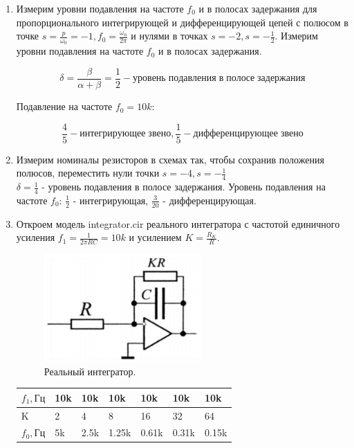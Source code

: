 \documentclass[12pt,a4paper]{article}
\begin{document}
\begin{enumerate}
    \item Измерим уровни подавления на частоте $f_0$ и в полосах задержания для пропорционального интегрирующей и дифференцирующей цепей 
    с полюсом в точке $s = \frac{p}{\omega_0} = -1, f_0 = \frac{\omega_0}{2\pi}$ и нулями в точках $s = -2, s = -\frac{1}{2}$.
    Измерим уровни подавления на частоте $f_0$ и в полосах задержания.

    \begin{equation}
        \delta = \frac{\beta}{\alpha + \beta} = \frac{1}{2} - уровень\; подавления\; в\; полосе\; задержания
    \end{equation}

    Подавление на частоте $f_0 = 10k$:

       $$ \frac{4}{5} - интегрирующее\; звено, \frac{1}{5} - дифференцирующее\; звено $$

    \item Измерим номиналы резисторов в схемах так, чтобы сохранив положения полюсов,
    переместить нули точки $s = -4, s = -\frac{1}{4}$ \\
    $\delta = \frac{1}{4}$ - уровень подавления в полосе задержания. Уровень подавления на частоте $f_0$: $\frac{1}{2}$ - интегрирующая, $\frac{3}{20}$ - дифференцирующая.
    \item Откроем модель integrator.cir реального интегратора с частотой единичного усиления $f_1 = \frac{1}{2\pi RC} = 10k$ и усилением $K = \frac{R_K}{R}$.
    
    \begin{figure}[H]
        \begin{center}
        \includegraphics[width=6cm]{реальный_интегратор.png}
        \caption{Реальный интегратор.}
        \label{real} %
        \end{center}
    \end{figure}

    \begin{table}[H]
        \centering
        \begin{center}
        \end{center}
        \vspace{0.1cm}
        \label{tab:my_label}
        \begin{tabular}{ |p{2cm}|p{1cm}|p{1cm}|p{1cm}|p{1cm}|p{1cm}|p{1cm}|}
     \hline
     $f_1, Гц$ &  10k & 10k & 10k & 10k & 10k & 10k \\
    \hline
    K &  2 & 4 & 8 & 16 & 32 & 64 \\
    \hline
    $f_0, Гц$ &  5k & 2.5k & 1.25k & 0.61k & 0.31k & 0.15k \\
    \hline
    

\end{tabular}
\end{table}
\end{enumerate}
\end{document}
